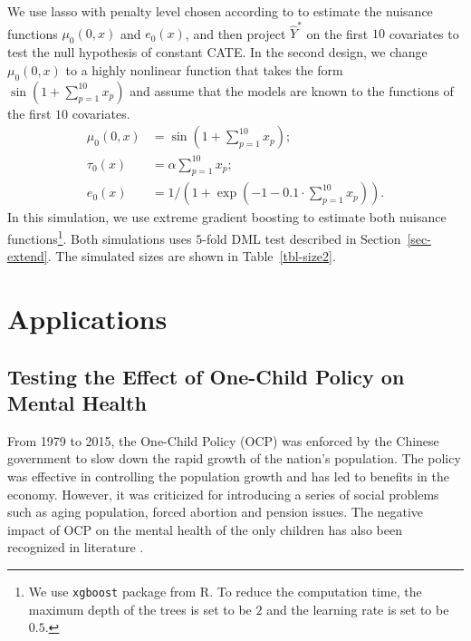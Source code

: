 \documentclass[
  12pt,
  12pt]{article}
\numberwithin{equation}{section}
\theoremstyle{definition}
\theoremstyle{plain}
\theoremstyle{plain}
\theoremstyle{remark}
\begin{document}
We use lasso with penalty level chosen according to
\citet{belloni2014high} to estimate the nuisance functions
\(\mu_0(0, x)\) and \(e_0(x)\), and then project \(\hat{Y}^*\) on the
first \(10\) covariates to test the null hypothesis of constant CATE. In
the second design, we change \(\mu_0(0, x)\) to a highly nonlinear
function that takes the form \(\sin(1 + \sum_{p = 1}^{10}x_p)\) and
assume that the models are known to the functions of the first \(10\)
covariates. \[
\begin{aligned}
\mu_0(0, x) &= \sin(1 + \sum_{p = 1}^{10}x_p); \\
\tau_0(x) &= \alpha \sum_{p = 1}^{10}x_p; \\
e_0(x) &= 1 / (1 + \exp(-1 - 0.1 \cdot \sum_{p = 1}^{10}x_p)).
\end{aligned}
\] In this simulation, we use extreme gradient boosting to estimate both
nuisance functions\footnote{We use \texttt{xgboost} package from R. To
  reduce the computation time, the maximum depth of the trees is set to
  be \(2\) and the learning rate is set to be \(0.5\).}. Both
simulations uses \(5\)-fold DML test described in
Section~\ref{sec-extend}. The simulated sizes are shown in
Table~\ref{tbl-size2}.

\section{Applications}\label{sec-app}

\subsection{Testing the Effect of One-Child Policy on Mental
Health}\label{sec-onechild}

From 1979 to 2015, the One-Child Policy (OCP) was enforced by the
Chinese government to slow down the rapid growth of the nation's
population. The policy was effective in controlling the population
growth and has led to benefits in the economy. However, it was
criticized for introducing a series of social problems such as aging
population, forced abortion and pension issues. The negative impact of
OCP on the mental health of the only children has also been recognized
in literature
\citep[e.g.][]{cameron2013little, wu2014only, zeng2020being}.
\end{document}
